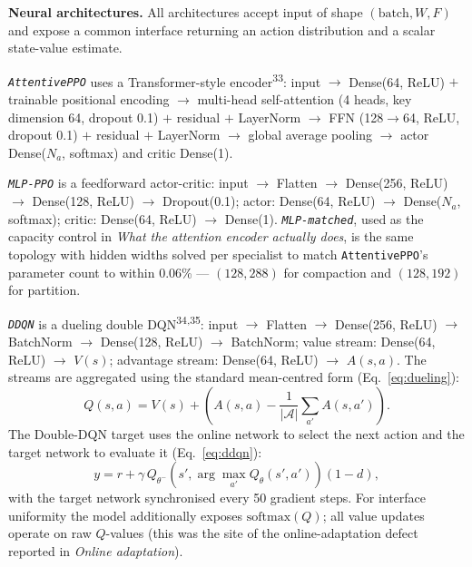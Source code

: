 \documentclass[fleqn,10pt]{wlscirep}
\newcommand{\attentive}{\texttt{AttentivePPO}}
\newcommand{\mlpppo}{\texttt{MLP-PPO}}
\newcommand{\matchedmlp}{\texttt{MLP-matched}}
\newcommand{\ddqn}{\texttt{DDQN}}
\begin{document}
\textbf{Neural architectures.}
All architectures accept input of shape $(\text{batch}, W, F)$ and
expose a common interface returning an action distribution and a scalar
state-value estimate.

\textit{\attentive{}} uses a Transformer-style
encoder\textsuperscript{33}:
input $\to$ Dense(64, ReLU) $+$ trainable positional encoding
$\to$ multi-head self-attention (4 heads, key dimension 64,
dropout 0.1) $+$ residual $+$ LayerNorm
$\to$ FFN (128$\to$64, ReLU, dropout 0.1) $+$ residual $+$ LayerNorm
$\to$ global average pooling $\to$ actor Dense($N_a$, softmax) and
critic Dense(1).

\textit{\mlpppo{}} is a feedforward actor-critic:
input $\to$ Flatten $\to$ Dense(256, ReLU) $\to$ Dense(128, ReLU)
$\to$ Dropout(0.1); actor: Dense(64, ReLU) $\to$ Dense($N_a$, softmax);
critic: Dense(64, ReLU) $\to$ Dense(1).
\textit{\matchedmlp{}}, used as the capacity control in \emph{What the
attention encoder actually does}, is the same topology with hidden widths
solved per specialist to match \attentive{}'s parameter count to within
0.06\% --- $(128, 288)$ for compaction and $(128, 192)$ for partition.

\textit{\ddqn{}} is a dueling double DQN\textsuperscript{34,35}:
input $\to$ Flatten $\to$ Dense(256, ReLU) $\to$ BatchNorm $\to$
Dense(128, ReLU) $\to$ BatchNorm; value stream: Dense(64, ReLU) $\to$
$V(s)$; advantage stream: Dense(64, ReLU) $\to$ $A(s,a)$. The streams
are aggregated using the standard mean-centred form
(Eq.~\ref{eq:dueling}):
\begin{equation}
Q(s,a) = V(s) + \left( A(s,a)
  - \frac{1}{|\mathcal{A}|}\sum_{a'} A(s,a') \right).
\label{eq:dueling}
\end{equation}
The Double-DQN target uses the online network to select the next action
and the target network to evaluate it (Eq.~\ref{eq:ddqn}):
\begin{equation}
y = r + \gamma\, Q_{\theta^-}\!\left(s',
  \arg\max_{a'} Q_{\theta}(s', a')\right)(1 - d),
\label{eq:ddqn}
\end{equation}
with the target network synchronised every 50 gradient steps.
For interface uniformity the model additionally exposes
$\mathrm{softmax}(Q)$; all value updates operate on raw $Q$-values
(this was the site of the online-adaptation defect reported in
\emph{Online adaptation}).
\end{document}
